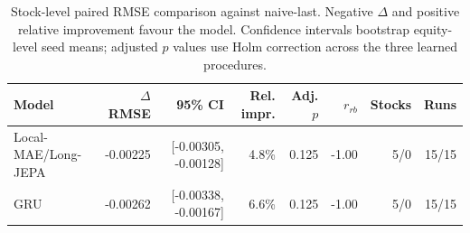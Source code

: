 \begin{table}[t]
\centering
\small
\caption{Stock-level paired RMSE comparison against naive-last. Negative $\Delta$ and positive relative improvement favour the model. Confidence intervals bootstrap equity-level seed means; adjusted $p$ values use Holm correction across the three learned procedures.}
\label{tab:paired_rmse_naive}
\begin{tabular}{lrrrrrrr}
\toprule
Model & $\Delta$RMSE & 95\% CI & Rel. impr. & Adj. $p$ & $r_{rb}$ & Stocks & Runs \\
\midrule
Local-MAE/Long-JEPA & -0.00225 & [-0.00305, -0.00128] & 4.8\% & 0.125 & -1.00 & 5/0 & 15/15 \\
GRU & -0.00262 & [-0.00338, -0.00167] & 6.6\% & 0.125 & -1.00 & 5/0 & 15/15 \\
\bottomrule
\end{tabular}
\end{table}
